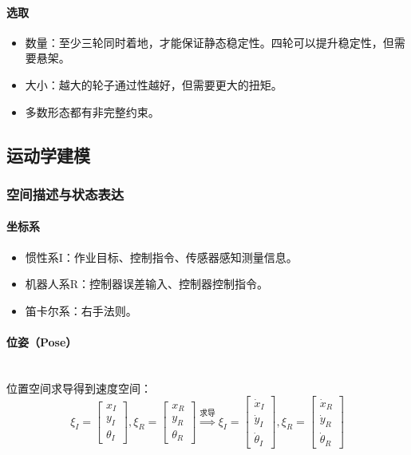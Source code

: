 \documentclass[
12pt, %
a4paper, 
oneside, %
headinclude,footinclude, %
]{scrartcl}
\begin{document}
\paragraph{选取}
\begin{itemize}
\item 数量：至少三轮同时着地，才能保证静态稳定性。四轮可以提升稳定性，但需要悬架。
\item 大小：越大的轮子通过性越好，但需要更大的扭矩。
\item 多数形态都有非完整约束。
\end{itemize}
\subsection[运动学建模]{运动学建模}
\subsubsection[空间描述与状态表达]{空间描述与状态表达}
\paragraph{坐标系}
\begin{itemize}
\item 惯性系I：作业目标、控制指令、传感器感知测量信息。
\item 机器人系R：控制器误差输入、控制器控制指令。
\item 笛卡尔系：右手法则。
\end{itemize}
\paragraph{位姿（Pose）}~\\

位置空间求导得到速度空间：
$$
\xi_I = \begin{bmatrix} x_I \\ y_I \\ \theta_I \end{bmatrix}, 
\xi_R = \begin{bmatrix} x_R \\ y_R \\ \theta_R \end{bmatrix}
\overset{\text{求导}}{\Longrightarrow}
\xi_I = \begin{bmatrix} \dot{x}_I \\ \dot{y}_I \\ \dot{\theta}_I \end{bmatrix},
\xi_R = \begin{bmatrix} \dot{x}_R \\ \dot{y}_R \\ \dot{\theta}_R \end{bmatrix}
$$
\end{document}
